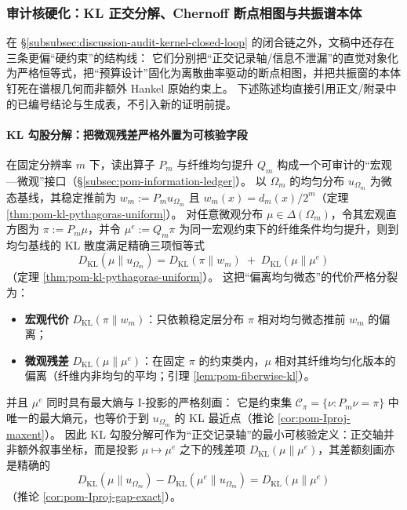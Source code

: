 
\subsubsection{审计核硬化：KL 正交分解、Chernoff 断点相图与共振谱本体}\label{subsubsec:discussion-audit-kernel-hardening-kl-chernoff-resonance}
在 \S\ref{subsubsec:discussion-audit-kernel-closed-loop} 的闭合链之外，文稿中还存在三条更偏“硬约束”的结构线：
它们分别把“正交记录轴/信息不泄漏”的直觉对象化为严格恒等式，把“预算设计”固化为离散曲率驱动的断点相图，并把共振窗的本体钉死在谱根几何而非额外 Hankel 原始约束上。
下述陈述均直接引用正文/附录中的已编号结论与生成表，不引入新的证明前提。

\paragraph{KL 勾股分解：把微观残差严格外置为可核验字段}
在固定分辨率 \(m\) 下，读出算子 \(P_m\) 与纤维均匀提升 \(Q_m\) 构成一个可审计的“宏观—微观”接口（\S\ref{subsec:pom-information-ledger}）。
以 \(\Omega_m\) 的均匀分布 \(u_{\Omega_m}\) 为微态基线，其稳定推前为
\(
w_m:=P_m u_{\Omega_m}
\)
且 \(w_m(x)=d_m(x)/2^m\)（定理 \ref{thm:pom-kl-pythagoras-uniform}）。
对任意微观分布 \(\mu\in\Delta(\Omega_m)\)，令其宏观直方图为 \(\pi:=P_m\mu\)，并令 \(\mu^e:=Q_m\pi\) 为同一宏观约束下的纤维条件均匀提升，则到均匀基线的 KL 散度满足精确三项恒等式
\[
\boxed{\;
D_{\mathrm{KL}}(\mu\|u_{\Omega_m})
=D_{\mathrm{KL}}(\pi\|w_m)\;+\;D_{\mathrm{KL}}(\mu\|\mu^e)\;}
\]
（定理 \ref{thm:pom-kl-pythagoras-uniform}）。
这把“偏离均匀微态”的代价严格分裂为：
\begin{itemize}
  \item \textbf{宏观代价} \(D_{\mathrm{KL}}(\pi\|w_m)\)：只依赖稳定层分布 \(\pi\) 相对均匀微态推前 \(w_m\) 的偏离；
  \item \textbf{微观残差} \(D_{\mathrm{KL}}(\mu\|\mu^e)\)：在固定 \(\pi\) 的约束类内，\(\mu\) 相对其纤维均匀化版本的偏离（纤维内非均匀的平均；引理 \ref{lem:pom-fiberwise-kl}）。
\end{itemize}
并且 \(\mu^e\) 同时具有最大熵与 I-投影的严格刻画：
它是约束集 \(\mathcal{C}_\pi=\{\nu:P_m\nu=\pi\}\) 中唯一的最大熵元，也等价于到 \(u_{\Omega_m}\) 的 KL 最近点（推论 \ref{cor:pom-Iproj-maxent}）。
因此 KL 勾股分解可作为“正交记录轴”的最小可核验定义：正交轴并非额外叙事坐标，而是投影 \(\mu\mapsto\mu^e\) 之下的残差项 \(D_{\mathrm{KL}}(\mu\|\mu^e)\)，其差额刻画亦是精确的
\[
D_{\mathrm{KL}}(\mu\|u_{\Omega_m})-D_{\mathrm{KL}}(\mu^e\|u_{\Omega_m})
=D_{\mathrm{KL}}(\mu\|\mu^e)
\]
（推论 \ref{cor:pom-Iproj-gap-exact}）。

